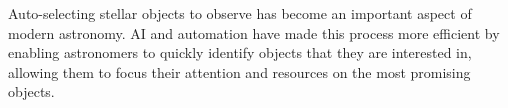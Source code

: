 \documentclass[12pt,letterpaper]{article}
\begin{document}
Auto-selecting stellar objects to observe has become an important aspect of modern 
astronomy. AI and automation have made this process more efficient by enabling astronomers 
to quickly identify objects that they are interested in, allowing them to focus their 
attention and resources on the most promising objects.\\
\end{document}
